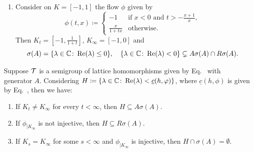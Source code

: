 \begin{examples}
\begin{enumerate}[\upshape (i), wide, labelindent=.25em]
	\item 
	Consider on $K = [-1,1]$ the flow $\phi$ given by
	\[
	\phi(t,x)\coloneq \begin{cases}
		-1 & \text{if } x < 0 \text{ and } t > -\frac{x+1}{x}  ,  \\
		\frac{x}{1+tx} & \text{otherwise.}
	\end{cases}
	\]
	Then $K_{t} = [-1,\frac{1}{1+t}]$, $K_{\infty} = [-1,0]$ and
	\[
	\sigma(A) = \{\lambda \in \C \colon \Re(\lambda) \leq 0\},\quad 
	\{\lambda \in \C \colon \Re(\lambda) < 0\} \subsetneq A\sigma(A)\cap R\sigma(A).
	\]
	\end{enumerate}
\end{examples}
\begin{theorem}\label{thm:b3-4.4}
	Suppose $\mathcal{T}$ is a semigroup of lattice homomorphisms given by Eq.~ with generator $A$.
	Considering $H \coloneq \{\lambda \in \C \colon \Re(\lambda) < \underline{c}(h,\phi)\}$, where $\underline{c}(h,\phi)$ is given by Eq.~, then we have:
	\begin{enumerate}[\upshape (i)]
		\item 
		If\/ $K_{t} \neq K_{\infty}$ for every $t < \infty$, then $H \subseteq A\sigma(A)$.
	
		\item 
		If\/ $\phi_{|K_{\infty}}$ is not injective, then $H \subseteq R\sigma(A)$.
	
		\item 
		If\/ $K_{s} = K_{\infty}$ for some $s < \infty$ and $\phi_{|K_{\infty}}$ is injective, then $H\cap\sigma(A) = \emptyset$.
	\end{enumerate} 
\end{theorem}
